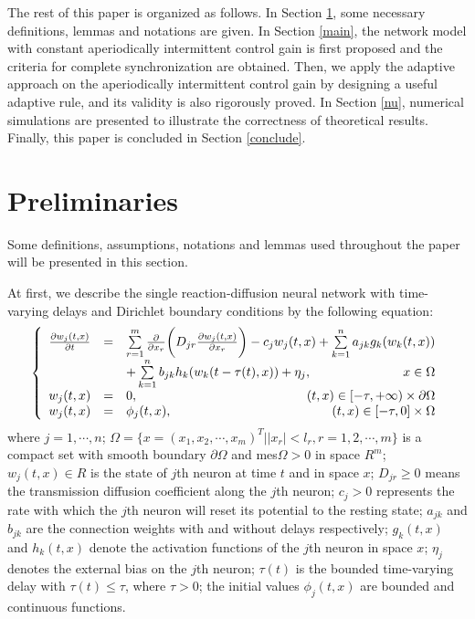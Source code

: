 \documentclass[review]{elsarticle}
\begin{document}
The rest of this paper is organized as follows. In Section \ref{pre}, some necessary definitions, lemmas and notations are given. In Section \ref{main}, the network model with constant aperiodically intermittent control gain is first proposed and the criteria for complete synchronization are obtained. Then, we apply the adaptive approach on the aperiodically intermittent control gain by designing a useful adaptive rule, and its validity is also rigorously proved. In Section \ref{nu}, numerical simulations are presented to illustrate the correctness of theoretical results. Finally, this paper is concluded in Section \ref{conclude}.

\section{Preliminaries}\label{pre}
Some definitions, assumptions, notations and lemmas used throughout the paper will be presented in this section.

At first, we describe the single reaction-diffusion neural network with time-varying delays and
Dirichlet boundary conditions by the following equation:
\begin{align}\label{ys}
\left\{
\begin{array}{ccl}
\frac{\partial{w}_j(t,x)}{\partial{t}}
&=&\sum\limits_{r=1}^m\frac{\partial{}}{\partial{x}_r}\bigg(D_{jr}
\frac{\partial{w}_j(t,x)}{\partial{x}_r}\bigg)
-c_jw_j(t,x)+\sum\limits_{k=1}^na_{jk}g_k(w_k(t,x))\\
&&+\sum\limits_{k=1}^nb_{jk}h_k(w_k(t-\tau(t),x))+\eta_j, \qquad\hfill{} x\in \Omega \\
w_j(t,x)&=&0,\quad\hfill{} (t,x)\in [-\tau,+\infty)\times\partial{\Omega}\\
w_j(t,x)&=&\phi_j(t,x),\quad\hfill{} (t,x)\in
[-\tau,0]\times\Omega
\end{array}\right.
\end{align}
where $j=1,\cdots,n$; $\Omega=\{x=(x_1,x_2,\cdots,x_m)^T||x_r|<l_r, r=1,2,\cdots,m\}$ is a compact set with smooth boundary $\partial{\Omega}$ and mes$\Omega>0$ in space $R^m$; $w_j(t,x)\in R$ is the state of $j$th neuron at time $t$ and in space
$x$; $D_{jr}\ge 0$ means the transmission diffusion coefficient along the $j$th neuron; $c_j>0$ represents the rate with which the $j$th neuron will reset its potential to the resting state; $a_{jk}$ and $b_{jk}$ are the connection weights with and without delays respectively; $g_k(t,x)$ and $h_k(t,x)$ denote the activation functions of the $j$th neuron in space $x$; $\eta_j$ denotes the external bias on the $j$th neuron; $\tau(t)$ is the bounded time-varying delay with $\tau(t)\le \tau$, where $\tau>0$; the initial values $\phi_j(t, x)$ are bounded and continuous functions.
\end{document}
